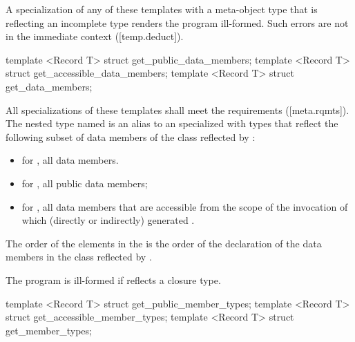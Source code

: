 \begin{std.txt}\color{addclr}
\pnum
A specialization of any of these templates with a meta-object type that is
reflecting an incomplete type renders the program ill-formed.  Such errors are
not in the immediate context ([temp.deduct]).

\begin{itemdecl}
template <Record T> struct get_public_data_members;
template <Record T> struct get_accessible_data_members;
template <Record T> struct get_data_members;
\end{itemdecl}

\begin{itemdescr}
\pnum
All specializations of these templates shall meet the  requirements ([meta.rqmts]). The nested type named  is an alias to an  specialized with  types that reflect the following subset of data members of the class reflected by :
\begin{itemize}
  \item for , all data members.
  \item for , all public data members;
  \item for , all data members that are accessible from the scope of the invocation of  which  (directly or indirectly) generated .
\end{itemize}

\pnum
The order of the elements in the  is the order of the declaration of the data members in the class reflected by .

\pnum
\remarks
The program is ill-formed if  reflects a closure type.

\end{itemdescr}

\begin{itemdecl}
template <Record T> struct get_public_member_types;
template <Record T> struct get_accessible_member_types;
template <Record T> struct get_member_types;
\end{itemdecl}


\end{std.txt}
